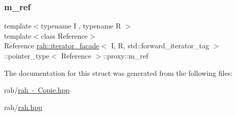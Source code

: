 \subsubsection{\texorpdfstring{m\_ref}{m\_ref}}
{\footnotesize\ttfamily template$<$typename I , typename R $>$ \\
template$<$class Reference$>$ \\
Reference \mbox{\hyperlink{structrah_1_1iterator__facade}{rah\+::iterator\+\_\+facade}}$<$ I, R, std\+::forward\+\_\+iterator\+\_\+tag $>$\+::pointer\+\_\+type$<$ Reference $>$\+::proxy\+::m\+\_\+ref}



The documentation for this struct was generated from the following files\+:\begin{DoxyCompactItemize}
\item 
rah/\mbox{\hyperlink{rah_01-_01_copie_8hpp}{rah -\/ Copie.\+hpp}}\item 
rah/\mbox{\hyperlink{rah_8hpp}{rah.\+hpp}}\end{DoxyCompactItemize}
